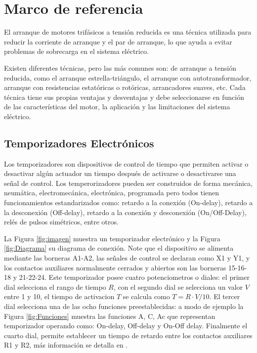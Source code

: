 \section{Marco de referencia}
El arranque de motores trifásicos a tensión reducida es una técnica utilizada para reducir la corriente de arranque y el par de arranque, lo que ayuda a evitar problemas de sobrecarga en el sistema eléctrico.

Existen diferentes técnicas, pero las más comunes son: de arranque a tensión reducida, como el arranque estrella-triángulo, el arranque con autotransformador, arranque con resistencias estatóricas o rotóricas, arrancadores suaves, etc. Cada técnica tiene sus propias ventajas y desventajas y debe seleccionarse en función de las características del motor, la aplicación y las limitaciones del sistema eléctrico.

\subsection{Temporizadores Electrónicos}

Los temporizadores son dispositivos de control de tiempo que permiten activar o desactivar algún actuador un tiempo después de activarse o desactivarse una señal de control. Los temperorizadores pueden ser  construidos de forma mecánica, neumática, electromecánica, electrónica, programada pero todos tienen funcionamientos estandarizados como: retardo a la conexión (On-delay), retardo a la desconexión (Off-delay), retardo a la conexión y desconexión (On/Off-Delay), relés de pulsos simétricos, entre otros. 

La Figura \ref{fig:imagen} muestra un temporizador electrónico y la Figura \ref{fig:Diagrama} su diagrama de conexión. Note que el dispositivo se alimenta mediante las borneras A1-A2,  las señales de control se declaran como X1 y Y1, y los contactos auxiliares normalmente cerrados y abiertos son las borneras 15-16-18 y 21-22-24. Este temporizador posee cuatro potenciometros o diales: el  primer dial selecciona el rango de tiempo $R$, con el segundo dial se selecciona un valor $V$ entre 1 y 10, el tiempo de activacion  $T$ se calcula como  $T=R\cdot V/10$. El tercer dial selecciona una de las ocho funciones preestablecidas: a modo de ejemplo la Figura \ref{fig:Funciones} muestra las funciones A, C, Ac que representan temporizador operando como: On-delay, Off-delay y On-Off delay. Finalmente el cuarto dial, permite establecer un tiempo de retardo entre los contactos auxiliares R1 y R2, más información se detalla en \cite{Scheneider4}.


